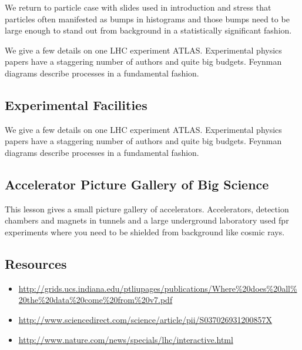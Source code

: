 We return to particle case with slides used in introduction and stress
that particles often manifested as bumps in histograms and those bumps
need to be large enough to stand out from background in a statistically
significant fashion.


We give a few details on one LHC experiment ATLAS. Experimental physics
papers have a staggering number of authors and quite big budgets.
Feynman diagrams describe processes in a fundamental fashion.


\subsection{Experimental Facilities}

We give a few details on one LHC experiment ATLAS. Experimental physics
papers have a staggering number of authors and quite big budgets.
Feynman diagrams describe processes in a fundamental fashion.


\subsection{Accelerator Picture Gallery of Big Science}

This lesson gives a small picture gallery of accelerators. Accelerators,
detection chambers and magnets in tunnels and a large underground
laboratory used fpr experiments where you need to be shielded from
background like cosmic rays.


\subsection{Resources}

\begin{itemize}

\item
  \url{http://grids.ucs.indiana.edu/ptliupages/publications/Where\%20does\%20all\%20the\%20data\%20come\%20from\%20v7.pdf}
\item
  \url{http://www.sciencedirect.com/science/article/pii/S037026931200857X}
\item
  \url{http://www.nature.com/news/specials/lhc/interactive.html}
\end{itemize}

